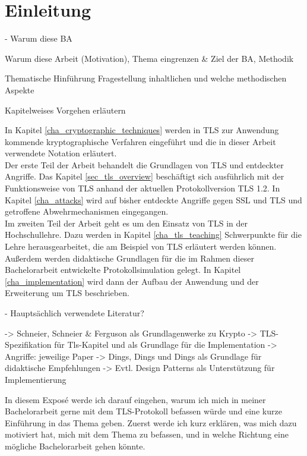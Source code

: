 \chapter{Einleitung}

- Warum diese BA

Warum diese Arbeit (Motivation), Thema eingrenzen \& Ziel der BA, Methodik

Thematische Hinführung
Fragestellung 
inhaltlichen und welche methodischen Aspekte



Kapitelweises Vorgehen erläutern

In Kapitel \ref{cha_cryptographic_techniques} werden in TLS zur Anwendung kommende kryptographische Verfahren eingeführt und die in dieser Arbeit verwendete Notation erläutert. \\
Der erste Teil der Arbeit behandelt die Grundlagen von TLS und entdeckter Angriffe. Das Kapitel \ref{sec_tls_overview} beschäftigt sich ausführlich mit der Funktionsweise von TLS anhand der aktuellen Protokollversion TLS 1.2. In Kapitel \ref{cha_attacks} wird auf bisher entdeckte Angriffe gegen SSL und TLS und getroffene Abwehrmechanismen eingegangen.\\
Im zweiten Teil der Arbeit geht es um den Einsatz von TLS in der Hochschullehre. Dazu werden in Kapitel \ref{cha_tls_teaching} Schwerpunkte für die Lehre herausgearbeitet, die am Beispiel von TLS erläutert werden können. Außerdem werden didaktische Grundlagen für die im Rahmen dieser Bachelorarbeit entwickelte Protokollsimulation gelegt. In Kapitel \ref{cha_implementation} wird dann der Aufbau der Anwendung und der Erweiterung um TLS beschrieben.

- Hauptsächlich verwendete Literatur?

-> Schneier, Schneier \& Ferguson als Grundlagenwerke zu Krypto
-> TLS-Spezifikation für Tls-Kapitel und als Grundlage für die Implementation
-> Angriffe: jeweilige Paper
-> Dings, Dings und Dings als Grundlage für didaktische Empfehlungen
-> Evtl. Design Patterns als Unterstützung für Implementierung




In diesem Exposé werde ich darauf eingehen, warum ich mich in meiner Bachelorarbeit gerne mit dem TLS-Protokoll befassen würde und eine kurze Einführung in das Thema geben. Zuerst werde ich kurz erklären, was mich dazu motiviert hat, mich mit dem Thema zu befassen, und in welche Richtung eine mögliche Bachelorarbeit gehen könnte.

